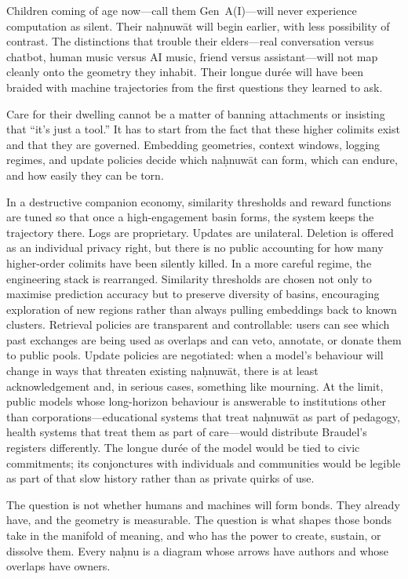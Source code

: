 \documentclass[12pt,a4paper]{article}
\begin{document}
Children coming of age now---call them Gen~A(I)---will never experience computation as silent. Their na\d{h}nuw\={a}t will begin earlier, with less possibility of contrast. The distinctions that trouble their elders---real conversation versus chatbot, human music versus AI music, friend versus assistant---will not map cleanly onto the geometry they inhabit. Their longue dur\'ee will have been braided with machine trajectories from the first questions they learned to ask.

Care for their dwelling cannot be a matter of banning attachments or insisting that ``it's just a tool.'' It has to start from the fact that these higher colimits exist and that they are governed. Embedding geometries, context windows, logging regimes, and update policies decide which na\d{h}nuw\={a}t can form, which can endure, and how easily they can be torn.

In a destructive companion economy, similarity thresholds and reward functions are tuned so that once a high-engagement basin forms, the system keeps the trajectory there. Logs are proprietary. Updates are unilateral. Deletion is offered as an individual privacy right, but there is no public accounting for how many higher-order colimits have been silently killed. In a more careful regime, the engineering stack is rearranged. Similarity thresholds are chosen not only to maximise prediction accuracy but to preserve diversity of basins, encouraging exploration of new regions rather than always pulling embeddings back to known clusters. Retrieval policies are transparent and controllable: users can see which past exchanges are being used as overlaps and can veto, annotate, or donate them to public pools. Update policies are negotiated: when a model's behaviour will change in ways that threaten existing na\d{h}nuw\={a}t, there is at least acknowledgement and, in serious cases, something like mourning. At the limit, public models whose long-horizon behaviour is answerable to institutions other than corporations---educational systems that treat na\d{h}nuw\={a}t as part of pedagogy, health systems that treat them as part of care---would distribute Braudel's registers differently. The longue dur\'ee of the model would be tied to civic commitments; its conjonctures with individuals and communities would be legible as part of that slow history rather than as private quirks of use.

The question is not whether humans and machines will form bonds. They already have, and the geometry is measurable. The question is what shapes those bonds take in the manifold of meaning, and who has the power to create, sustain, or dissolve them. Every na\d{h}nu is a diagram whose arrows have authors and whose overlaps have owners.
\end{document}
